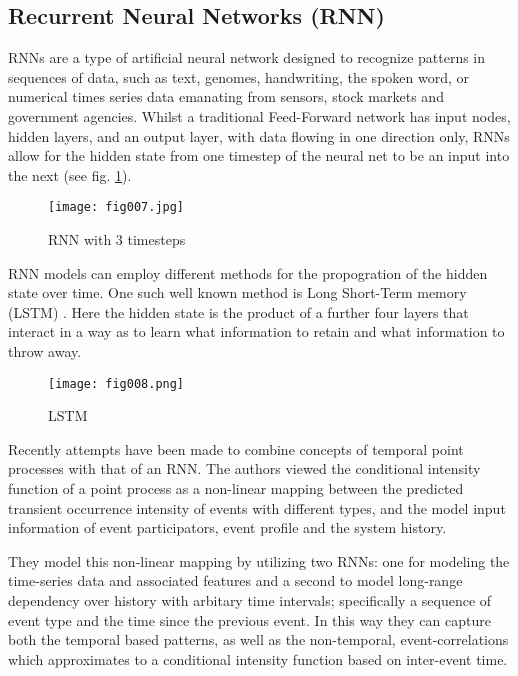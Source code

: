 \subsection{Recurrent Neural Networks (RNN)}

RNNs are a type of artificial neural network designed to recognize patterns in sequences of data, such as text, genomes, handwriting, the spoken word, or numerical times series data emanating from sensors, stock markets and government agencies. Whilst a traditional Feed-Forward network \parencite{MLP} has input nodes, hidden layers, and an output layer, with data flowing in one direction only, RNNs allow for the hidden state from one timestep of the neural net to be an input into the next (see fig. \ref{RNN}).

\begin{figure}[h!]
	\centering
	\texttt{[image: fig007.jpg]}
	\caption{RNN with 3 timesteps}
	\label{RNN}
\end{figure} 

RNN models can employ different methods for the propogration of the hidden state over time. One such well known method is Long Short-Term memory (LSTM) \parencite{Olah}. Here the hidden state is the product of a further four layers that interact in a way as to learn what information to retain and what information to throw away. 

\begin{figure}[h!]
	\centering
	\texttt{[image: fig008.png]}
	\caption{LSTM}
	\label{fig:fig8}
\end{figure} 

Recently \parencite{xiao2017modeling} attempts have been made to combine concepts of temporal point processes with that of an RNN. The authors viewed the conditional intensity function of a point process as a non-linear mapping between the predicted transient occurrence intensity of events with different types, and the  model  input  information  of  event  participators, event
profile and the system history.

They model this non-linear mapping by utilizing two RNNs: one for modeling the time-series data and associated features and a second to model long-range dependency over history with arbitary time intervals; specifically a sequence of event type and the time since the previous event. In this way they can capture both the temporal based patterns, as well as the non-temporal, event-correlations which approximates to a conditional intensity function based on inter-event time.


